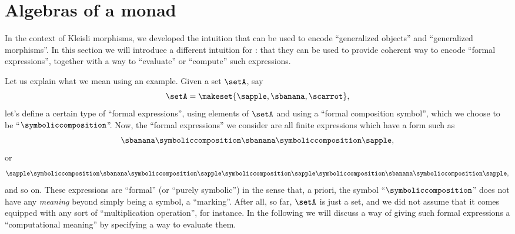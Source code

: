 
\section{Algebras of a monad}
\label{sec:Eilenberg-Moore}



In the context of Kleisli morphisms, we developed the intuition that  can be used to encode ``generalized objects'' and ``generalized morphisms''.
In this section we will introduce a different intuition for : that they can be used to provide coherent way to encode ``formal expressions'', together with a way to ``evaluate'' or ``compute'' such expressions.

Let us explain what we mean using an example.
Given a set $\setA$, say
\begin{equation}
    \setA = \makeset{ \sapple, \sbanana, \scarrot },
\end{equation}
let's define a certain type of ``formal expressions'', using elements of $\setA$ and using a ``formal composition symbol'', which we choose to be ``$\symboliccomposition$''.
Now, the ``formal expressions'' we consider are all finite expressions which have a form such as
\begin{equation}
    \label{eq:formal-composition-1}
    \sbanana \symboliccomposition \sbanana \symboliccomposition \sapple,
\end{equation}
or
\begin{equation}
    \label{eq:formal-composition-2}
    \sapple \symboliccomposition \sbanana \symboliccomposition \sapple \symboliccomposition \sapple \symboliccomposition \sbanana \symboliccomposition \sapple,
\end{equation}
and so on.
These expressions are ``formal'' (or ``purely symbolic'') in the sense that, a priori, the symbol ``$\symboliccomposition$'' does not have any \emph{meaning} beyond simply being a symbol, a ``marking''.
After all, so far, $\setA$ is just a set, and we did not assume that it comes equipped with any sort of ``multiplication operation'', for instance.
In the following we will discuss a way of giving such formal expressions a ``computational meaning'' by specifying a way to evaluate them.

